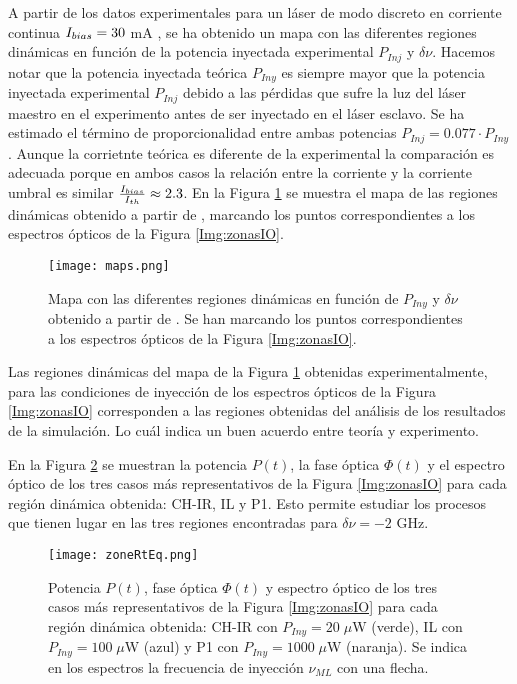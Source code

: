 		A partir de los datos experimentales para un láser de modo discreto en corriente continua $I_{bias} = 30$ mA \cite{Chaves19}, se ha obtenido un mapa con las diferentes regiones dinámicas en función de la potencia inyectada experimental $P_{Inj}$ y $\delta\nu$. Hacemos notar que la potencia inyectada teórica $P_{Iny}$ es siempre mayor que la potencia inyectada experimental $P_{Inj}$ debido a las pérdidas que sufre la luz del láser maestro en el experimento antes de ser inyectado en el láser esclavo. Se ha estimado el término de proporcionalidad entre ambas potencias $P_{Inj} = 0.077 \cdot P_{Iny}$ \cite{Chaves19}. Aunque la corrietnte teórica es diferente de la experimental la comparación es adecuada porque en ambos casos la relación entre la corriente y la corriente umbral es similar $\frac{I_{bias}}{I_{th}} \approx 2.3$. En la Figura \ref{fig:map} se muestra el mapa de las regiones dinámicas obtenido a partir de \cite{Chaves19}, marcando los puntos correspondientes a los espectros ópticos de la Figura \ref{Img:zonasIO}.

			\begin{figure}[H]
				\centering
				\texttt{[image: maps.png]}
				\caption{\label{fig:map}Mapa con las diferentes regiones dinámicas en función de $P_{Iny}$ y $\delta\nu$ obtenido a partir de \cite{Chaves19}. Se han marcando los puntos correspondientes a los espectros ópticos de la Figura \ref{Img:zonasIO}.}
			\end{figure}

		Las regiones dinámicas del mapa de la Figura \ref{fig:map} obtenidas experimentalmente, para las condiciones de inyección de los espectros ópticos de la Figura \ref{Img:zonasIO} corresponden a las regiones obtenidas del análisis de los resultados de la simulación. Lo cuál indica un buen acuerdo entre teoría y experimento.

		En la Figura \ref{fig:zoneRtEq} se muestran la potencia $P(t)$, la fase óptica $\Phi (t)$ y el espectro óptico de los tres casos más representativos de la Figura \ref{Img:zonasIO} para cada región dinámica obtenida: CH-IR, IL y P1. Esto permite estudiar los procesos que tienen lugar en las tres regiones encontradas para $\delta\nu = -2$ GHz. 

			\begin{figure}[H]
				\centering
				\texttt{[image: zoneRtEq.png]}
				\caption{\label{fig:zoneRtEq}Potencia $P(t)$, fase óptica $\Phi (t)$ y espectro óptico de los tres casos más representativos de la Figura \ref{Img:zonasIO} para cada región dinámica obtenida: CH-IR con $P_{Iny} = 20\;\mu$W (verde), IL con $P_{Iny} = 100\;\mu$W (azul) y P1 con $P_{Iny} = 1000\;\mu$W (naranja). Se indica en los espectros la frecuencia de inyección $\nu_{ML}$ con una flecha.}	
			\end{figure}

